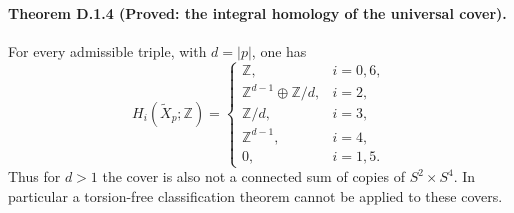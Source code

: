 \paragraph{Theorem D.1.4 (Proved: the integral homology of the universal cover).}
For every admissible triple, with $d=|p|$, one has
\[
 H_i(\widetilde X_p;\mathbb Z)=
 \begin{cases}
 \mathbb Z,&i=0,6,\\
 \mathbb Z^{d-1}\oplus\mathbb Z/d,&i=2,\\
 \mathbb Z/d,&i=3,\\
 \mathbb Z^{d-1},&i=4,\\
 0,&i=1,5.
 \end{cases}
\]
Thus for $d>1$ the cover is also not a connected sum of copies of
$S^2\times S^4$. In particular a torsion-free classification theorem
cannot be applied to these covers.
